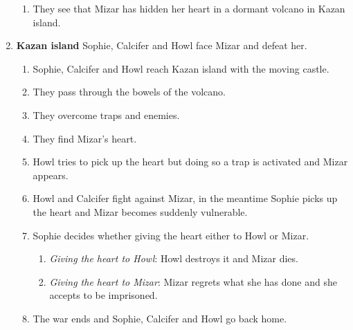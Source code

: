 \begin{enumerate}
\begin{enumerate}
  \item They see that Mizar has hidden her heart in a dormant volcano in Kazan island.
  \end{enumerate}
    
\item \textbf{Kazan island} Sophie, Calcifer and Howl face Mizar and defeat her.

  \begin{enumerate}
  \item Sophie, Calcifer and Howl reach Kazan island with the moving castle.
    
  \item They pass through the bowels of the volcano.
    
  \item They overcome traps and enemies.
    
  \item They find Mizar's heart.
    
  \item Howl tries to pick up the heart but doing so a trap is activated and Mizar appears.
    
    
  \item Howl and Calcifer fight against Mizar, in the meantime Sophie picks up the heart and Mizar becomes suddenly vulnerable.
    
  \item Sophie decides whether giving the heart either to Howl or Mizar.
    
    \begin{enumerate}
    \item \textit{Giving the heart to Howl}: Howl destroys it and Mizar dies.
      
    \item \textit{Giving the heart to Mizar}: Mizar regrets what she has done and she accepts to be imprisoned.
    \end{enumerate}
    
  \item The war ends and Sophie, Calcifer and Howl go back home.
  \end{enumerate}

\end{enumerate}
